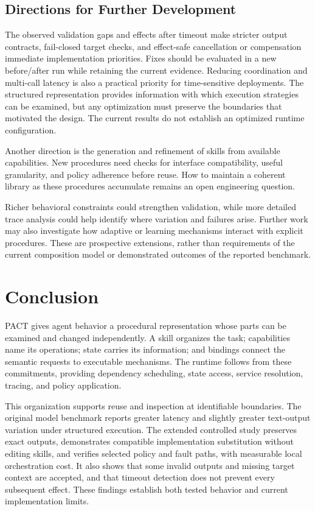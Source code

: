 \documentclass[10pt,twocolumn,a4paper]{article}
\begin{document}
\subsection{Directions for Further Development}

The observed validation gaps and effects after timeout make stricter output contracts, fail-closed target checks, and effect-safe cancellation or compensation immediate implementation priorities. Fixes should be evaluated in a new before/after run while retaining the current evidence. Reducing coordination and multi-call latency is also a practical priority for time-sensitive deployments. The structured representation provides information with which execution strategies can be examined, but any optimization must preserve the boundaries that motivated the design. The current results do not establish an optimized runtime configuration.


Another direction is the generation and refinement of skills from available capabilities. New procedures need checks for interface compatibility, useful granularity, and policy adherence before reuse. How to maintain a coherent library as these procedures accumulate remains an open engineering question.


Richer behavioral constraints could strengthen validation, while more detailed trace analysis could help identify where variation and failures arise. Further work may also investigate how adaptive or learning mechanisms interact with explicit procedures. These are prospective extensions, rather than requirements of the current composition model or demonstrated outcomes of the reported benchmark.


\balance\thispagestyle{fancy}

\section{Conclusion}

PACT gives agent behavior a procedural representation whose parts can be examined and changed independently. A skill organizes the task; capabilities name its operations; state carries its information; and bindings connect the semantic requests to executable mechanisms. The runtime follows from these commitments, providing dependency scheduling, state access, service resolution, tracing, and policy application.


This organization supports reuse and inspection at identifiable boundaries. The original model benchmark reports greater latency and slightly greater text-output variation under structured execution. The extended controlled study preserves exact outputs, demonstrates compatible implementation substitution without editing skills, and verifies selected policy and fault paths, with measurable local orchestration cost. It also shows that some invalid outputs and missing target context are accepted, and that timeout detection does not prevent every subsequent effect. These findings establish both tested behavior and current implementation limits.
\end{document}
